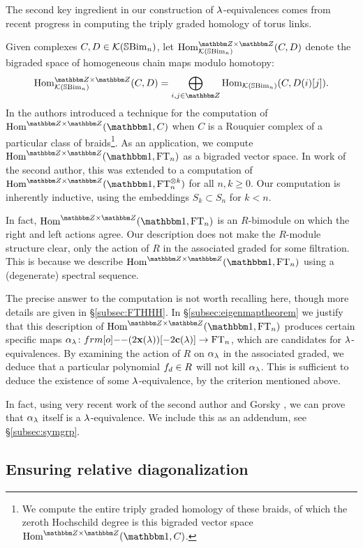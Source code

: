 The second key ingredient in our construction of $\lambda$-equivalences comes from recent progress in computing the triply graded homology of torus links.

Given complexes $C,D\in {\mathcal{K}}({\mathbb{S}}{\rm Bim }_n)$, let $\Hom_{\KC(\SBim_n)}^{\Z\times \Z}(C,D)$ denote the bigraded space of homogeneous chain maps modulo homotopy:
\[
\Hom_{\KC(\SBim_n)}^{\Z\times \Z}(C,D) = \bigoplus_{i,j\in \Z}\Hom_{\KC(\SBim_n)}(C,D(i)[j]).
\]
In \cite{ElHog16a} the authors introduced a technique for the computation of $\Hom^{\Z\times \Z}(\one,C)$ when $C$ is a Rouquier complex of a particular class of braids\footnote{We compute the entire triply graded homology of these braids, of which the zeroth Hochschild degree is this bigraded vector space $\Hom^{\Z\times \Z}(\one,C)$.}. As an application, we compute $\Hom^{\Z\times \Z}(\one,\FT_n)$ as a bigraded vector space. In work of the second author, this was extended to a computation of $\Hom^{\Z\times \Z}(\one,\FT_n^{\otimes k})$ for all $n,k\geq 0$. Our computation is inherently inductive, using the embeddings $S_k \subset S_n$ for $k < n$.

In fact, $\Hom^{\Z\times \Z}(\one,\FT_n)$ is an $R$-bimodule on which the right and left actions agree. Our description does not make the $R$-module structure clear, only
the action of $R$ in the associated graded for some filtration. This is because we describe $\Hom^{\Z\times \Z}(\one,\FT_n)$ using a (degenerate) spectral sequence.

The precise answer to the computation is not worth recalling here, though more details are given in \S\ref{subsec:FTHHH}. In \S\ref{subsec:eigenmaptheorem} we justify that this
description of $\Hom^{\Z\times \Z}(\one,\FT_n)$ produces certain specific maps $\a_\l \co \one(2\xbb(\l))[-2\cbb(\l)] \to \FT_n$, which are candidates for $\lambda$-equivalences. By examining
the action of $R$ on $\alpha_\lambda$ in the associated graded, we deduce that a particular polynomial $f_{d} \in R$ will not kill $\alpha_\lambda$. This is sufficient to deduce the existence of some $\lambda$-equivalence, by the criterion mentioned above.

\begin{remark} In fact, using very recent work of the second author and Gorsky \cite{GorHog17}, we can prove that $\alpha_\lambda$ itself is a $\lambda$-equivalence. We include this as an addendum, see \S\ref{subsec:symgrp}. \end{remark}


\subsection{Ensuring relative diagonalization}

